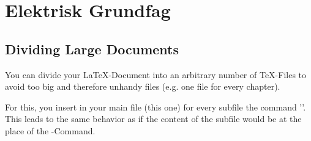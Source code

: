 \chapter{Elektrisk Grundfag}


\section{Dividing Large Documents}\label{dividing}
You can divide your \LaTeX-Document into an arbitrary number of \TeX-Files
to avoid too big and therefore unhandy files (e.g. one file for every chapter).

For this, you insert in your main file (this one) for every subfile
the command '\verb##'. This leads to the same behavior
as if the content of the subfile would be at the place of the \verb##-Command.

